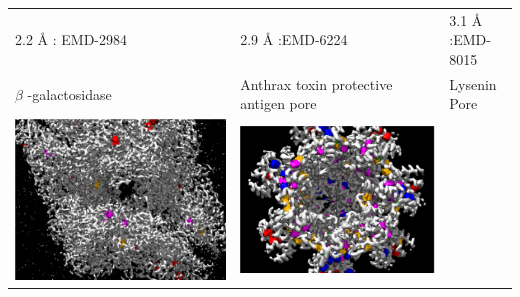 \begin{table}
\small
\begin{tabular}{|m{4cm}|m{4cm}|m{4cm}|}
      \hline
       \Large{ 2.2 {\AA} }: EMD-2984 & \Large{ 2.9 {\AA} }:EMD-6224 & \Large{ 3.1 {\AA} }:EMD-8015\\
      $\beta$ -galactosidase & Anthrax toxin protective antigen pore & Lysenin Pore  \\
      \includegraphics[scale = 0.14]{pics/res22.png} & 
      \includegraphics[scale = 0.14]{pics/res28.png} &

\end{tabular}
\end{table}
